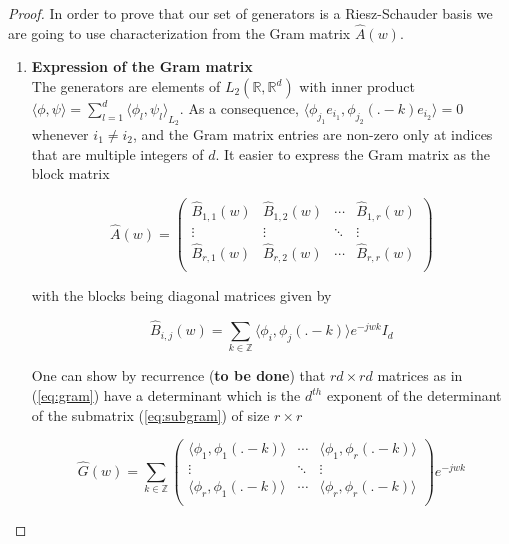 \documentclass[a4paper, 11pt]{article}
\begin{document}
\begin{proof}
  In order to prove that our set of generators is a Riesz-Schauder basis we are going to use characterization from the 
  Gram matrix $\hat{A}(w)$. \\

  \begin{enumerate}
    \item{\textbf{Expression of the Gram matrix}}\\ 
      The generators are elements of $L_2(\mathbb{R}, \mathbb{R}^d)$ with inner product $\displaystyle \langle \phi, 
      \psi \rangle = \sum_{l=1}^d {\langle \phi_l, \psi_l \rangle}_{L_2}$.  As a consequence, $\langle \phi_{j_1} 
      e_{i_1}, \phi_{j_2}(.-k) e_{i_2} \rangle = 0$ whenever $i_1 \neq i_2$, and the Gram matrix entries are non-zero 
      only at indices that are multiple integers of $d$. It easier to express the Gram matrix as the block matrix

      \begin{equation}
        \label{eq:gram}
        \hat{A}(w) =
        \begin{pmatrix}
          \hat{B}_{1,1}(w) & \hat{B}_{1,2}(w) & \cdots & \hat{B}_{1,r}(w) \\
          \vdots & \vdots & \ddots & \vdots \\
          \hat{B}_{r,1}(w) & \hat{B}_{r,2}(w) & \cdots & \hat{B}_{r,r}(w) \\
        \end{pmatrix}
      \end{equation}

      with the blocks being diagonal matrices given by

        \begin{equation}
          \hat{B}_{i,j}(w) = \sum_{k \in \mathbb{Z}} \langle \phi_i, \phi_j(.-k) \rangle e^{-jwk} I_d        
        \end{equation}
        
        One can show by recurrence (\textbf{to be done}) that $rd\times rd$ matrices as in (\ref{eq:gram}) have a 
        determinant which is the $d^{th}$ exponent of the determinant of the submatrix (\ref{eq:subgram}) of size $r\times 
        r$

        \begin{equation}
          \label{eq:subgram}
          \hat{G}(w) =
          \sum_{k \in \mathbb{Z}}
          \begin{pmatrix}
          \langle \phi_1, \phi_1(.-k) \rangle & \cdots & \langle \phi_1, \phi_r(.-k) \rangle\\
          \vdots & \ddots & \vdots \\
          \langle \phi_r, \phi_1(.-k) \rangle & \cdots & \langle \phi_r, \phi_r(.-k) \rangle\\
          \end{pmatrix}
          e^{-jwk}
        \end{equation}


\end{enumerate}
\end{proof}
\end{document}
